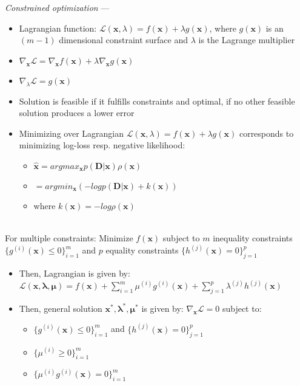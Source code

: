 \emph{Constrained optimization} --- 
\begin{itemize}
    \item Lagrangian function: $\mathcal{L}(\boldsymbol{x},\lambda) = f(\boldsymbol{x}) + \lambda g(\boldsymbol{x})$, where $g(\boldsymbol{x})$ is an $(m-1)$ dimensional constraint surface and $\lambda$ is the Lagrange multiplier
    \item$\nabla_{\boldsymbol{x}} \mathcal{L} = \nabla_{\boldsymbol{x}} f(\boldsymbol{x}) + \lambda \nabla_{\boldsymbol{x}} g(\boldsymbol{x})$
    \item$\nabla_{\lambda} \mathcal{L} = g(\boldsymbol{x})$
    \item Solution is feasible if it fulfills constraints and optimal, if no other feasible solution produces a lower error
    \item Minimizing over Lagrangian $\mathcal{L}(\boldsymbol{x},\lambda) = f(\boldsymbol{x}) + \lambda g(\boldsymbol{x})$ corresponds to minimizing log-loss resp. negative likelihood:
    \begin{itemize}
        \item $\hat{\boldsymbol{x}} = argmax_\boldsymbol{x} p(\boldsymbol{D} |\boldsymbol{x}) \rho(\boldsymbol{x}) $ 
        \item $= argmin_\boldsymbol{x} (- log p(\boldsymbol{D} |\boldsymbol{x}) + k(\boldsymbol{x}))$
        \item where $k(\boldsymbol{x}) = -log \rho(\boldsymbol{x})$
    \end{itemize}
\end{itemize}\\
For multiple constraints: Minimize $f(\boldsymbol{x})$ subject to $m$ inequality constraints $\{g^{(i)}(\boldsymbol{x}) \leq 0\}_{i=1}^m$ and $p$ equality constraints $\{h^{(j)}(\boldsymbol{x}) = 0\}_{j=1}^p$ 
\begin{itemize}
    \item Then, Lagrangian is given by: $\mathcal{L}(\boldsymbol{x},\boldsymbol{\lambda},\boldsymbol{\mu}) = f(\boldsymbol{x}) + \sum_{i=1}^m \mu^{(i)} g^{(i)}(\boldsymbol{x}) + \sum_{j=1}^p \lambda^{(j)} h^{(j)}(\boldsymbol{x})$
    \item Then, general solution $\boldsymbol{x^*},\boldsymbol{\lambda^*},\boldsymbol{\mu^*}$ is given by: $\nabla_{\boldsymbol{x}} \mathcal{L} = 0$ subject to:
    \begin{itemize}
        \item $\{g^{(i)}(\boldsymbol{x}) \leq 0\}_{i=1}^m$ and $\{h^{(j)}(\boldsymbol{x}) = 0\}_{j=1}^p$ 
        \item $\{\mu^{(i)} \geq 0\}_{i=1}^m$
        \item $\{\mu^{(i)}g^{(i)}(\boldsymbol{x}) = 0\}_{i=1}^m$
    \end{itemize}
\end{itemize}

